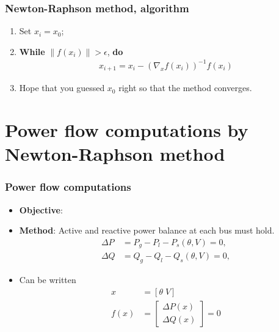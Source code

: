 \documentclass{beamer}
\newcommand\norm[1]{\left\lVert#1\right\rVert}
\begin{document}
\begin{frame}
  \frametitle{Newton-Raphson method, algorithm}
  \begin{enumerate}
  \item Set $x_i = x_0$;
  \item \textbf{While} $\norm{f(x_i)}> \epsilon$, \textbf{do}
    \begin{align}
      \label{eq:2}
      x_{i+1} = x_i - \left(\nabla_x f(x_i) \right)^{-1} f(x_i)
    \end{align}
  \item Hope that you guessed $x_0$ right so that the method converges.
  \end{enumerate}
\end{frame}

\section[Power flow]{Power flow computations by Newton-Raphson method}

\begin{frame}
  \frametitle{Power flow computations}
  \begin{itemize}
  \item \textbf{Objective}:  
  \item<3-> \textbf{Method}: Active and reactive power balance at each bus must hold.
    \begin{align}
      \Delta P &= P_g - P_l - P_s(\theta,V) = 0,\\
      \Delta Q &= Q_g - Q_l - Q_s(\theta,V) = 0,
    \end{align}
  \item<4> Can be written
    \begin{align}
      x &= [\theta \; V] \\
      f(x) &= \begin{bmatrix}
      \Delta P(x)\\
      \Delta Q(x)
      \end{bmatrix}=0
    \end{align}
  \end{itemize}
\end{frame}
\end{document}
